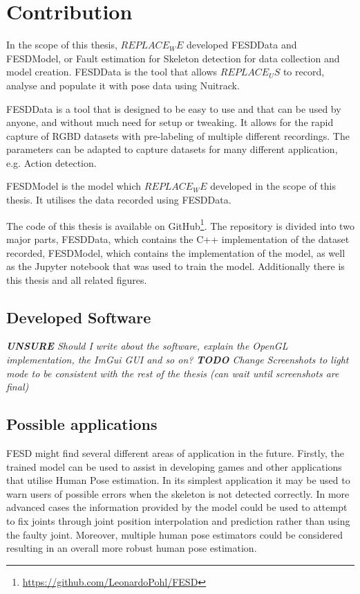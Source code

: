 \section{Contribution}
\label{sec:contribution}

In the scope of this thesis, $REPLACE_WE$ developed FESDData and FESDModel, or Fault estimation for Skeleton detection for data collection and model creation. FESDData is the tool that allows $REPLACE_US$ to record, analyse and populate it with pose data using Nuitrack. 

FESDData is a tool that is designed to be easy to use and that can be used by anyone, and without much need for setup or tweaking. It allows for the rapid capture of RGBD datasets with pre-labeling of multiple different recordings. The parameters can be adapted to capture datasets for many different application, e.g. Action detection.

FESDModel is the model which $REPLACE_WE$ developed in the scope of this thesis. It utilises the data recorded using FESDData.

The code of this thesis is available on GitHub\footnote{\url{https://github.com/LeonardoPohl/FESD}}. The repository is divided into two major parts, FESDData, which contains the C++ implementation of the dataset recorded, FESDModel, which contains the implementation of the model, as well as the Jupyter notebook that was used to train the model. Additionally there is this thesis and all related figures.

\subsection{Developed Software}

\textit{\textbf{UNSURE} Should I write about the software, explain the OpenGL implementation, the ImGui GUI and so on?}
\textit{\textbf{TODO} Change Screenshots to light mode to be consistent with the rest of the thesis (can wait until screenshots are final)}



\subsection{Possible applications}

FESD might find several different areas of application in the future. Firstly, the trained model can be used to assist in developing games and other applications that utilise Human Pose estimation. In its simplest application it may be used to warn users of possible errors when the skeleton is not detected correctly. In more advanced cases the information provided by the model could be used to attempt to fix joints through joint position interpolation and prediction rather than using the faulty joint. Moreover, multiple human pose estimators could be considered resulting in an overall more robust human pose estimation.


